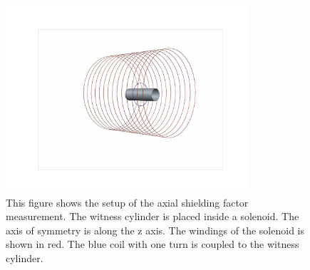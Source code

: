 \documentclass[review]{elsarticle}
\begin{document}
\begin{figure}[h!]
\begin{center}
   \includegraphics[width=0.8\textwidth]{geometry.pdf}
    \caption{This figure shows the setup of the axial shielding factor measurement. The witness cylinder is placed inside a solenoid. The axis of symmetry is along the z axis. The windings of the solenoid is shown in red. The blue coil with one turn is coupled to the witness cylinder.   }
    \label{fig:geometry}
    \end{center}
\end{figure} 
\end{document}
